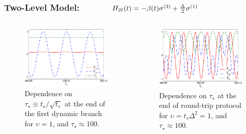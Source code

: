 \begin{frame}
	
	\frametitle{Two-Level Model:	$\qquad \qquad H_{2\ell}(t) = - \beta(t) 
				\sigma^{(3)}+ {\Delta\over 2} \sigma^{(1)}$}
	
	\begin{columns}
	\begin{column}{0.52\textwidth}
		\begin{figure}[!htb]
  			\includegraphics[width=1\columnwidth]{paper/oscillationa.pdf}
  			\caption{Dependence on $\tau_\star\equiv t_\star/\sqrt{t_s}$ at 
  			the end of the first dynamic branch for $\upsilon=1$, 
  			and $\tau_\star\approx 100$.}
 		 	\label{lzfigs}
		\end{figure}
	
	\end{column}
	\begin{column}{0.5\textwidth}
		\begin{figure}[!htb]
			\includegraphics[width=1\columnwidth]{paper/oscillationc.pdf}
  			\caption{Dependence on $\tau_\star$ at the end of round-trip 
  			protocol for $\upsilon= t_s \Delta^2 =1$, and 
  			$\tau_\star\approx 100$.}
  			\label{lzfigs}
		\end{figure}


	\end{column}
	\end{columns}


\end{frame}
